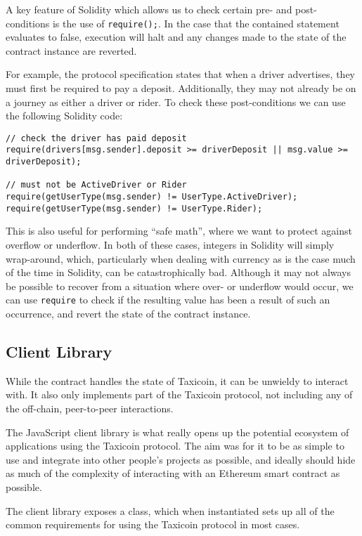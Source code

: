 A key feature of Solidity which allows us to check certain pre- and post-conditions is the use of \lstinline{require();}. In the case that the contained statement evaluates to false, execution will halt and any changes made to the state of the contract instance are reverted.

For example, the protocol specification states that when a driver advertises, they must first be required to pay a deposit. Additionally, they may not already be on a journey as either a driver or rider. To check these post-conditions we can use the following Solidity code:

\begin{lstlisting}[language=Solidity]
// check the driver has paid deposit
require(drivers[msg.sender].deposit >= driverDeposit || msg.value >= driverDeposit);

// must not be ActiveDriver or Rider
require(getUserType(msg.sender) != UserType.ActiveDriver);
require(getUserType(msg.sender) != UserType.Rider);
\end{lstlisting}

This is also useful for performing \enquote{safe math}, where we want to protect against overflow or underflow. In both of these cases, integers in Solidity will simply wrap-around, which, particularly when dealing with currency as is the case much of the time in Solidity, can be catastrophically bad. Although it may not always be possible to recover from a situation where over- or underflow would occur, we can use \lstinline{require} to check if the resulting value has been a result of such an occurrence, and revert the state of the contract instance.

\subsection{Client Library}

While the contract handles the state of Taxicoin, it can be unwieldy to interact with. It also only implements part of the Taxicoin protocol, not including any of the off-chain, peer-to-peer interactions.

The JavaScript client library is what really opens up the potential ecosystem of applications using the Taxicoin protocol. The aim was for it to be as simple to use and integrate into other people's projects as possible, and ideally should hide as much of the complexity of interacting with an Ethereum smart contract as possible.

The client library exposes a class, which when instantiated sets up all of the common requirements for using the Taxicoin protocol in most cases.

